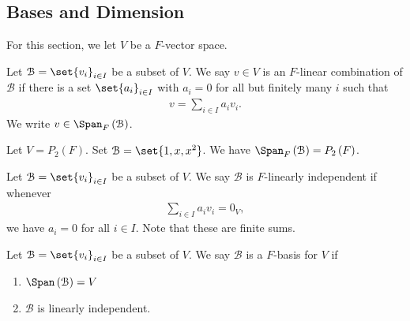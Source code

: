 \documentclass[10pt]{mypackage}
\begin{document}
\subsection{Bases and Dimension}%
For this section, we let $V $ be a $ F$-vector space.
\begin{definition}
  Let $\mathcal{B} = \set{v_i}_{i\in I}$ be a subset of $V$. We say $v\in V$ is an $F$-linear combination of $\mathcal{B}$ if there is a set $\set{a_i}_{i\in I}$ with $a_i = 0$ for all but finitely many $i$ such that
  \begin{align*}
    v = \sum_{i\in I}a_iv_i.
  \end{align*}
  We write $v\in \Span_{F}\left(\mathcal{B}\right)$.
\end{definition}
\begin{example}
  Let $V = P_2\left(F\right)$. Set $\mathcal{B} = \set{1,x,x^2}$. We have $\Span_{F}\left(\mathcal{B}\right) = P_2\left(F\right)$.
\end{example}
\begin{definition}
  Let $\mathcal{B} = \set{v_i}_{i\in I}$ be a subset of $V$. We say $\mathcal{B}$ is $F$-linearly independent if whenever
  \begin{align*}
    \sum_{i\in I}a_iv_i = 0_V,
  \end{align*}
  we have $a_i = 0 $ for all $i\in I$. Note that these are finite sums.
\end{definition}
\begin{definition}
  Let $\mathcal{B} = \set{v_i}_{i\in I}$ be a subset of $V$. We say $\mathcal{B}$ is a $F$-basis for $V$ if
  \begin{enumerate}[(1)]
    \item $\Span\left(\mathcal{B}\right) = V$
    \item $\mathcal{B}$ is linearly independent.
  \end{enumerate}
\end{definition}
\end{document}
